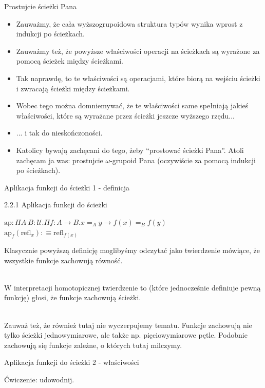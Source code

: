 \documentclass{beamer}
\newcommand{\defn}{:\equiv}
\newcommand{\U}{\mathcal{U}}
\newcommand{\refl}[1]{\text{refl}_{#1}}
\newcommand{\ap}[2]{\text{ap}_{#1}(#2)}
\begin{document}
\begin{frame}{Prostujcie ścieżki Pana}
\begin{itemize}
	\item Zauważmy, że cała wyższogrupoidowa struktura typów wynika wprost z indukcji po ścieżkach.
	\item Zauważmy też, że powyższe właściwości operacji na ścieżkach są wyrażone za pomocą ścieżek między ścieżkami.
	\item Tak naprawdę, to te właściwości są operacjami, które biorą na wejściu ścieżki i zwracają ścieżki między ścieżkami.
	\item Wobec tego można domniemywać, że te właściwości same spełniają jakieś właściwości, które są wyrażane przez ścieżki jeszcze wyższego rzędu...
	\item ... i tak do nieskończoności.
	\item Katolicy bywają zachęcani do tego, żeby ``prostować ścieżki Pana''. Atoli zachęcam ja was: prostujcie $\omega$-grupoid Pana (oczywiście za pomocą indukcji po ścieżkach).
\end{itemize}
\end{frame}

\begin{frame}{Aplikacja funkcji do ścieżki 1 - definicja}

\begin{block}{2.2.1 Aplikacja funkcji do ścieżki}

$\text{ap} : \Pi A\ B : \U. \Pi f : A \to B. x =_A y \to f(x) =_B f(y)$ \\
$\ap{f}{\refl{x}} \defn \refl{f(x)}$

\end{block}

Klasycznie powyższą definicję moglibyśmy odczytać jako twierdzenie mówiące, że wszystkie funkcje zachowują równość. \\~\

W interpretacji homotopicznej twierdzenie to (które jednocześnie definiuje pewną funkcję) głosi, że funkcje zachowują ścieżki. \\~\

Zauważ też, że również tutaj nie wyczerpujemy tematu. Funkcje zachowują nie tylko ścieżki jednowymiarowe, ale także np. pięciowymiarowe pętle. Podobnie zachowują się funkcje zależne, o których tutaj milczymy.

\end{frame}

\begin{frame}{Aplikacja funkcji do ścieżki 2 - właściwości}

Ćwiczenie: udowodnij.

\end{frame}
\end{document}

